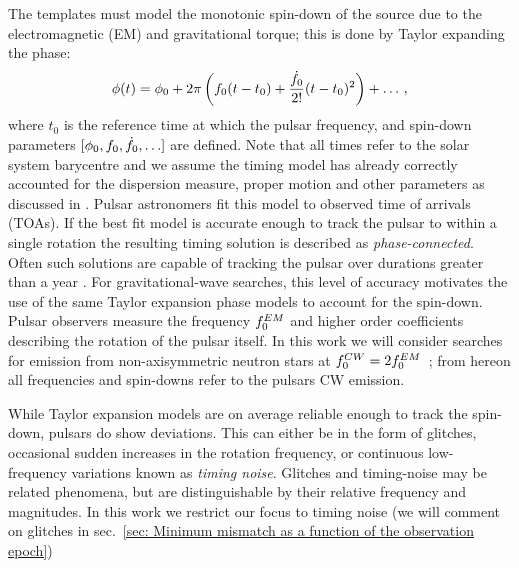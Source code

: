 \documentclass[../full_thesis/full_thesis.tex]{subfiles}
\begin{document}
The templates must model the monotonic spin-down of the source due to the
electromagnetic (EM) and gravitational torque; this is done by Taylor expanding
the phase:
\begin{equation}
\phi(t) = \phi_{0} + 2\pi\left(f_{0} (t - t_{0}) + 
          \frac{\dot{f}_{0}}{2!} (t - t_{0})^{2} 
           \right)
           + \ldots
           \,,
\label{eqn: Taylor}
\end{equation}
where $t_{0}$ is the reference time at which the pulsar frequency, and
spin-down parameters $[\phi_{0}, f_{0}, \dot{f}_{0}, \ldots]$ are defined. Note
that all times refer to the solar system barycentre and we assume the 
timing model has already correctly accounted for the dispersion measure, proper motion
and other parameters as discussed in \citet{Edwards2006}.
Pulsar astronomers fit this model to observed time of arrivals (TOAs). If the
best fit model is accurate enough to track the pulsar to within a single
rotation the resulting timing solution is described as \emph{phase-connected}.
Often such solutions are capable of tracking the pulsar over durations greater
than  a year \citep{Lyne2012book}.  For gravitational-wave searches, this level of accuracy
motivates the use of the same Taylor expansion phase models to account for the
spin-down.  Pulsar observers measure the frequency $f_{0}^{EM}$ and higher
order coefficients describing the rotation of the pulsar itself. In this
work we will consider searches for
emission from non-axisymmetric neutron stars at
$f_{0}^{CW}=2f_{0}^{EM}$~\citep{Shapiro83}; from hereon all frequencies
and spin-downs refer to the pulsars CW emission.

While Taylor expansion models are on average reliable enough to track the
spin-down, pulsars do show deviations. This can either be in the form of
glitches, occasional sudden increases in the rotation frequency, or 
continuous low-frequency 
variations known as \emph{timing noise}. Glitches and timing-noise may be
related phenomena, but are distinguishable by their relative frequency
and magnitudes. In this work we restrict our focus to timing noise (we will comment
        on glitches in sec.~\ref{sec: Minimum mismatch as a function of the observation epoch})
\end{document}
